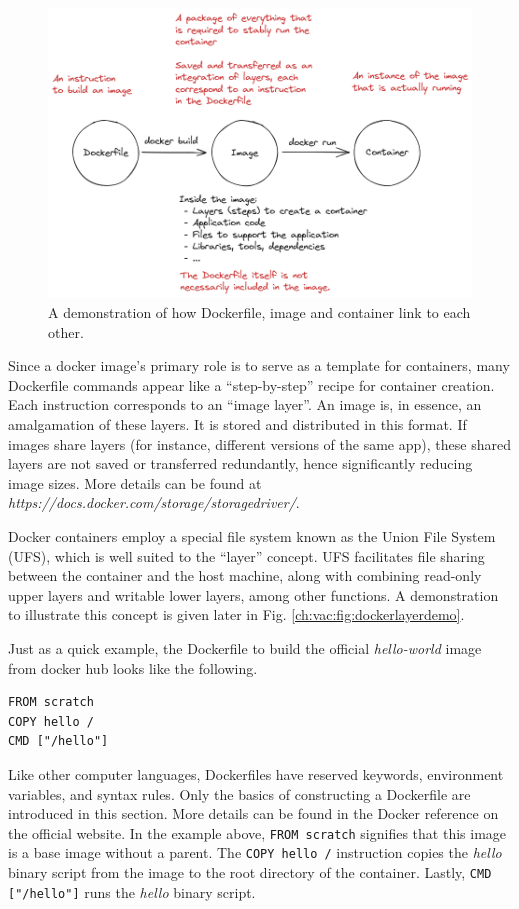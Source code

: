 \begin{figure}[htbp]
	\centering
	\includegraphics[width=350pt]{chapters/part-3/figures/dockerfiletoimage.png}
	\caption{A demonstration of how Dockerfile, image and container link to each other.} \label{ch:vac:fig:dockerfiletoimage}
\end{figure}

Since a docker image's primary role is to serve as a template for containers, many Dockerfile commands appear like a ``step-by-step'' recipe for container creation. Each instruction corresponds to an ``image layer''. An image is, in essence, an amalgamation of these layers. It is stored and distributed in this format. If images share layers (for instance, different versions of the same app), these shared layers are not saved or transferred redundantly, hence significantly reducing image sizes. More details can be found at \textit{https://docs.docker.com/storage/storagedriver/}.

Docker containers employ a special file system known as the Union File System (UFS), which is well suited to the ``layer'' concept. UFS facilitates file sharing between the container and the host machine, along with combining read-only upper layers and writable lower layers, among other functions. A demonstration to illustrate this concept is given later in Fig. \ref{ch:vac:fig:dockerlayerdemo}.

Just as a quick example, the Dockerfile to build the official \textit{hello-world} image from docker hub looks like the following.
\begin{lstlisting}
FROM scratch
COPY hello /
CMD ["/hello"]
\end{lstlisting}
Like other computer languages, Dockerfiles have reserved keywords, environment variables, and syntax rules. Only the basics of constructing a Dockerfile are introduced in this section. More details can be found in the Docker reference on the official website. In the example above, \verb|FROM scratch| signifies that this image is a base image without a parent. The \verb|COPY hello /| instruction copies the \textit{hello} binary script from the image to the root directory of the container. Lastly, \verb|CMD ["/hello"]| runs the \textit{hello} binary script.

